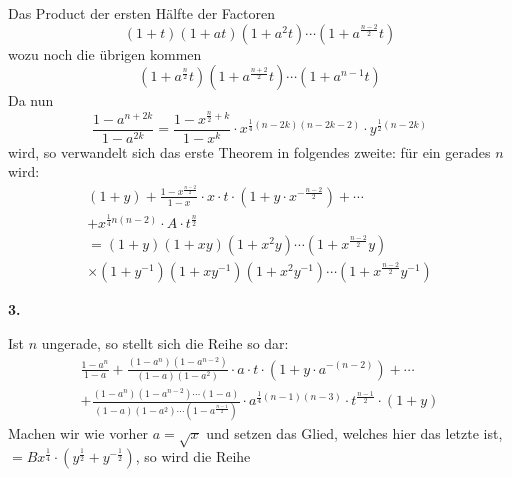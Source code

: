 \documentclass[10pt,a4paper]{article}
\begin{document}
Das Product der ersten H\"alfte der Factoren
%
\begin{equation*}
(1 + t)(1 + at)(1 + a^2t) \cdots (1 + a^{\frac{n-2}{2}}t)
\end{equation*}
%
wozu noch die \"ubrigen kommen
%
\begin{equation*}
(1 + a^{\frac{n}{2}}t)(1 + a^{\frac{n+2}{2}}t) \cdots (1 + a^{n-1}t)
\end{equation*}
%
Da nun
%
\begin{equation*}
\frac{1 - a^{n+2k}}{1 - a^{2k}} = \frac{1 - x^{\frac{n}{2}+k}}{1 - x^k} \cdot x^{\frac{1}{4}(n - 2k)(n - 2k - 2)} \cdot y^{\frac{1}{2}(n - 2k)}
\end{equation*}
%
wird, so verwandelt sich das erste Theorem in folgendes zweite: f\"ur ein gerades $n$ wird:
%
\begin{multline*}
(1 + y) + \frac{1 - x^{\frac{n-2}{2}}}{1 - x} \cdot x \cdot t \cdot (1 + y \cdot x^{-\frac{n-2}{2}}) + \cdots \\
+ x^{\frac{1}{4}n(n-2)} \cdot A \cdot t^{\frac{n}{2}} \\
= (1 + y)(1 + xy)(1 + x^2y) \cdots (1 + x^{\frac{n-2}{2}}y) \\
\times (1 + y^{-1})(1 + xy^{-1})(1 + x^2y^{-1}) \cdots (1 + x^{\frac{n-2}{2}}y^{-1})
\end{multline*}

\textbf{3.}

Ist $n$ ungerade, so stellt sich die Reihe so dar:
%
\begin{multline*}
\frac{1 - a^n}{1 - a} + \frac{(1 - a^n)(1 - a^{n-2})}{(1 - a)(1 - a^2)} \cdot a \cdot t \cdot (1 + y \cdot a^{-(n-2)}) + \cdots \\
+ \frac{(1 - a^n)(1 - a^{n-2}) \cdots (1 - a)}{(1 - a)(1 - a^2) \cdots (1 - a^{\frac{n-1}{2}})} \cdot a^{\frac{1}{4}(n-1)(n-3)} \cdot t^{\frac{n-1}{2}} \cdot (1 + y)
\end{multline*}
%
Machen wir wie vorher $a = \sqrt{x}$ und setzen das Glied, welches hier das letzte ist, $= Bx^{\frac{1}{4}} \cdot (y^{\frac{1}{2}} + y^{-\frac{1}{2}})$, so wird die Reihe

\newpage
\end{document}
